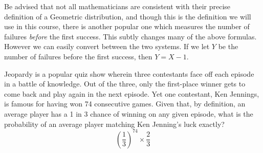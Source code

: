     Be advised that not all mathematicians are consistent with their precise definition of a Geometric distribution, and though this is the definition we will use in this course, there is another popular one which measures the number of failures \emph{before} the first success. This subtly changes many of the above formulas. However we can easily convert between the two systems. If we let $Y$ be the number of failures before the first success, then $Y=X-1$.
    \begin{example}
        Jeopardy is a popular quiz show wherein three contestants face off each episode in a battle of knowledge. Out of the three, only the first-place winner gets to come back and play again in the next episode. Yet one contestant, Ken Jennings, is famous for having won 74 consecutive games. Given that, by definition, an average player has a 1 in 3 chance of winning on any given episode, what is the probability of an average player matching Ken Jenning's luck exactly?
        \solution
        \[
            \left(\frac 1 3\right)^{74}\times \frac 2 3
        \]
    \end{example}
